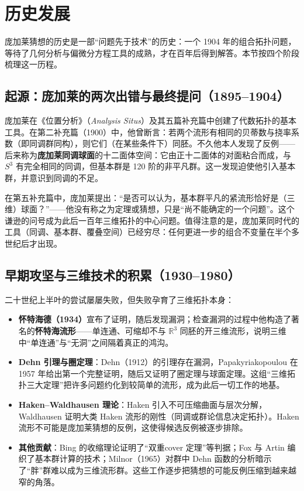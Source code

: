 \section{历史发展}\label{sec:history}

庞加莱猜想的历史是一部“问题先于技术”的历史：一个 1904 年的组合拓扑问题，等待了几何分析与偏微分方程工具的成熟，才在百年后得到解答。本节按四个阶段梳理这一历程。

\subsection{起源：庞加莱的两次出错与最终提问（1895--1904）}

庞加莱在《位置分析》（\textit{Analysis Situs}）及其五篇补充篇\cite{poincare1895,poincare1904}中创建了代数拓扑的基本工具。在第二补充篇（1900）中，他曾断言：若两个流形有相同的贝蒂数与挠率系数（即同调群同构），则它们（在某些条件下）同胚。不久他本人发现了反例——后来称为\textbf{庞加莱同调球面}的十二面体空间：它由正十二面体的对面粘合而成，与 $S^3$ 有完全相同的同调，但基本群是 120 阶的非平凡群。这一发现迫使他引入基本群，并意识到同调的不足。

在第五补充篇\cite{poincare1904}中，庞加莱提出：“是否可以认为，基本群平凡的紧流形恰好是（三维）球面？”——他没有称之为定理或猜想，只是“尚不能确定的一个问题”。这个谦逊的问号成为此后一百年三维拓扑的中心问题。值得注意的是，庞加莱同时代的工具（同调、基本群、覆叠空间）已经穷尽：任何更进一步的组合不变量在半个多世纪后才出现。

\subsection{早期攻坚与三维技术的积累（1930--1980）}

二十世纪上半叶的尝试屡屡失败，但失败孕育了三维拓扑本身：

\begin{itemize}
    \item \textbf{怀特海德（1934）}宣布了证明\cite{whitehead1934}，随后发现漏洞；检查漏洞的过程中他构造了著名的\textbf{怀特海流形}——单连通、可缩却不与 $\mathbb{R}^3$ 同胚的开三维流形，说明三维中“单连通”与“无洞”之间隔着真正的鸿沟。
    \item \textbf{Dehn 引理与圈定理}：Dehn（1912）的引理存在漏洞，Papakyriakopoulou 在 1957 年给出第一个完整证明\cite{papakyriakou1957}，随后又证明了圈定理与球面定理。这组“三维拓扑三大定理”把许多问题约化到较简单的流形，成为此后一切工作的地基。
    \item \textbf{Haken--Waldhausen 理论}：Haken 引入不可压缩曲面与层次分解\cite{haken1962}，Waldhausen 证明大类 Haken 流形的刚性（同调或群论信息决定拓扑）。Haken 流形不可能是庞加莱猜想的反例，这使得候选反例被逐步排除。
    \item \textbf{其他贡献}：Bing 的收缩理论证明了“双重cover 定理”等判据；Fox 与 Artin 编织了基本群计算的技术；Milnor（1965）对群中 Dehn 函数的分析暗示了“胖”群难以成为三维流形群。这些工作逐步把猜想的可能反例压缩到越来越窄的角落。
\end{itemize}

